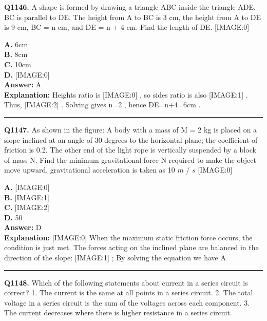 \documentclass[12pt]{article}
\begin{document}
\noindent
\textbf{Q1146.} A shape is formed by drawing a triangle ABC inside the triangle ADE. BC is parallel to DE. The height from A to BC is 3 cm, the height from A to DE is 9 cm, BC = n cm, and DE = n + 4 cm.
Find the length of DE.
[IMAGE:0]



\textbf{A.} 6cm \\
\textbf{B.} 8cm \\
\textbf{C.} 10cm \\
\textbf{D.} [IMAGE:0] \\

\textbf{Answer:} A \\
\textbf{Explanation:} Heights ratio is
[IMAGE:0]
, so sides ratio is also
[IMAGE:1]
. Thus,
[IMAGE:2]
. Solving gives n=2
, hence DE=n+4=6cm
.

\hrule
\vspace{1em}


\noindent
\textbf{Q1147.} As shown in the figure: A body with a mass of M = 2 kg is placed on a slope inclined at an angle of 30 degrees to the horizontal plane; the coefficient of friction is 0.2. The other end of the light rope is vertically suspended by a block of mass N. Find the minimum gravitational force N required to make the object move upward. gravitational acceleration is taken as 10
$𝑚$
/
$𝑠$
[IMAGE:0]



\textbf{A.} [IMAGE:0] \\
\textbf{B.} [IMAGE:1] \\
\textbf{C.} [IMAGE:2] \\
\textbf{D.} 50 \\

\textbf{Answer:} D \\
\textbf{Explanation:} [IMAGE:0]
When the maximum static friction force occurs, the condition is just met. The forces acting on the inclined plane are balanced in the direction of the slope:
[IMAGE:1]
; By solving the equation we have A

\hrule
\vspace{1em}


\noindent
\textbf{Q1148.} Which of the following statements about current in a series circuit is correct?
1.
The current is the same at all points in a series circuit.
2.
The total voltage in a series circuit is the sum of the voltages across each component.
3.
The current decreases where there is higher resistance in a series circuit.
\end{document}

